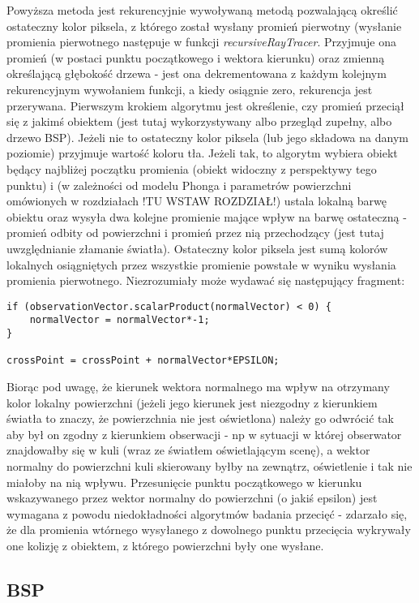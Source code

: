Powyższa metoda jest rekurencyjnie wywoływaną metodą pozwalającą określić ostateczny kolor piksela, z którego został wysłany promień pierwotny (wysłanie promienia pierwotnego następuje w funkcji \emph{recursiveRayTracer}. Przyjmuje ona promień (w postaci punktu początkowego i wektora kierunku) oraz zmienną określającą głębokość drzewa - jest ona dekrementowana z każdym kolejnym rekurencyjnym wywołaniem funkcji, a kiedy osiągnie zero, rekurencja jest przerywana. Pierwszym krokiem algorytmu jest określenie, czy promień przeciął się z jakimś obiektem (jest tutaj wykorzystywany albo przegląd zupełny, albo drzewo BSP). Jeżeli nie to ostateczny kolor piksela (lub jego składowa na danym poziomie) przyjmuje wartość koloru tła. Jeżeli tak, to algorytm wybiera obiekt będący najbliżej początku promienia (obiekt widoczny z perspektywy tego punktu) i (w zależności od modelu Phonga i parametrów powierzchni omówionych w rozdziałach !TU WSTAW ROZDZIAŁ!) ustala lokalną barwę obiektu oraz wysyła dwa kolejne promienie mające wpływ na barwę ostateczną - promień odbity od powierzchni i promień przez nią przechodzący (jest tutaj uwzględnianie złamanie światła).
Ostateczny kolor piksela jest sumą kolorów lokalnych osiągniętych przez wszystkie promienie powstałe w wyniku wysłania promienia pierwotnego.	Niezrozumiały może wydawać się następujący fragment:

\begin{lstlisting}
if (observationVector.scalarProduct(normalVector) < 0) {
    normalVector = normalVector*-1;
}

crossPoint = crossPoint + normalVector*EPSILON;
\end{lstlisting}

Biorąc pod uwagę, że kierunek wektora normalnego ma wpływ na otrzymany kolor lokalny powierzchni (jeżeli jego kierunek jest niezgodny z kierunkiem światła to znaczy, że powierzchnia nie jest oświetlona) należy go odwrócić tak aby był on zgodny z kierunkiem obserwacji - np w sytuacji w której obserwator znajdowałby się w kuli (wraz ze światłem oświetlającym scenę), a wektor normalny do powierzchni kuli skierowany byłby na zewnątrz, oświetlenie i tak nie miałoby na nią wpływu. Przesunięcie punktu początkowego w kierunku wskazywanego przez wektor normalny do powierzchni (o jakiś epsilon) jest wymagana z powodu niedokładności algorytmów badania przecięć - zdarzało się, że dla promienia wtórnego wysyłanego z dowolnego punktu przecięcia wykrywały one kolizję z obiektem, z którego powierzchni były one wysłane.

\subsection{BSP}

